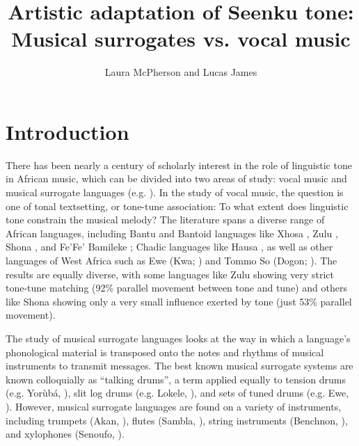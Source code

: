 \documentclass[output=paper]{langscibook}
\author{Laura McPherson\affiliation{Dartmouth College} and Lucas James\affiliation{Dartmouth College}}
\title{Artistic adaptation of Seenku tone: Musical surrogates vs. vocal music}
\begin{document}
\maketitle


\section{Introduction}

There has been nearly a century of scholarly interest in the role of linguistic tone in African music, which can be divided into two areas of study: vocal music and musical surrogate languages (e.g. \citealt{Stern1957,SebeokUmiker-Sebeok1976}). In the study of vocal music, the question is one of tonal textsetting, or tone-tune association: To what extent does linguistic tone constrain the musical melody? The literature spans a diverse range of African languages, including Bantu and Bantoid languages like Xhosa \citep{Starke1930},
Zulu \citep{Rycroft1959,Rycroft1979},
Shona \citep{Schellenberg2009}, and
Fe'Fe' Bamileke \citep{Proto2016};
Chadic languages like Hausa \citep{Richards1972,Leben1983},
as well as other languages of West Africa such as
Ewe (Kwa; \citealt{Jones1959,Hornbostel1928}) and
Tommo So (Dogon;  \citealt{McPhersonRyan2018}).
The results are equally diverse, with some languages like Zulu showing very strict tone-tune matching (92\% parallel movement between tone and tune) and others like Shona showing only a very small influence exerted by tone (just 53\% parallel movement).

The study of musical surrogate languages looks at the way in which a language's phonological material is transposed onto the notes and rhythms of musical instruments to transmit messages. The best known musical surrogate systems are known colloquially as ``talking drums'', a term applied equally to tension drums (e.g. Yorùbá, \citealt{Beier1954}),
slit log drums (e.g. Lokele, \citealt{Carrington1949}), and sets of tuned drums (e.g. Ewe, \citealt{LockeAgbeli1981}). However, musical surrogate languages are found on a variety of instruments, including trumpets (Akan, \citealt{Kaminski2008}), flutes (Sambla, \citealt{McPherson2019a}), string instruments (Benchnon, \citealt{Wedekind1983}), and xylophones (Senoufo, \citealt{ZempSoro2010}).
\end{document}
